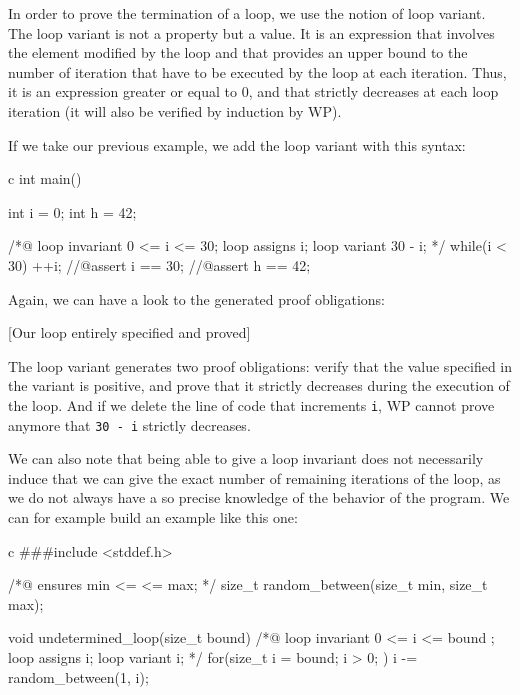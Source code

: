 In order to prove the termination of a loop, we use the notion of loop
variant. The loop variant is not a property but a value. It is an
expression that involves the element modified by the loop and that
provides an upper bound to the number of iteration that have to be
executed by the loop at each iteration. Thus, it is an expression
greater or equal to 0, and that strictly decreases at each loop
iteration (it will also be verified by induction by WP).


If we take our previous example, we add the loop variant with this
syntax:



\begin{CodeBlock}{c}
int main(){
  int i = 0;
  int h = 42;
  
  /*@
    loop invariant 0 <= i <= 30;
    loop assigns i;
    loop variant 30 - i;
  */
  while(i < 30){
    ++i;
  }
  //@assert i == 30;
  //@assert h == 42;
}
\end{CodeBlock}



Again, we can have a look to the generated proof obligations:



[Our loop entirely specified and proved]


The loop variant generates two proof obligations: verify that the value
specified in the variant is positive, and prove that it strictly
decreases during the execution of the loop. And if we delete the line of
code that increments \texttt{i}, WP cannot prove anymore that
\texttt{30\ -\ i} strictly decreases.

We can also note that being able to give a loop invariant does not
necessarily induce that we can give the exact number of remaining
iterations of the loop, as we do not always have a so precise knowledge
of the behavior of the program. We can for example build an example like
this one:



\begin{CodeBlock}{c}
###include <stddef.h>

/*@
  ensures min <= \result <= max;
*/
size_t random_between(size_t min, size_t max);

void undetermined_loop(size_t bound){
  /*@
    loop invariant 0 <= i <= bound ;
    loop assigns i;
    loop variant i;
   */
  for(size_t i = bound; i > 0; ){
    i -= random_between(1, i);
  }
}
\end{CodeBlock}


